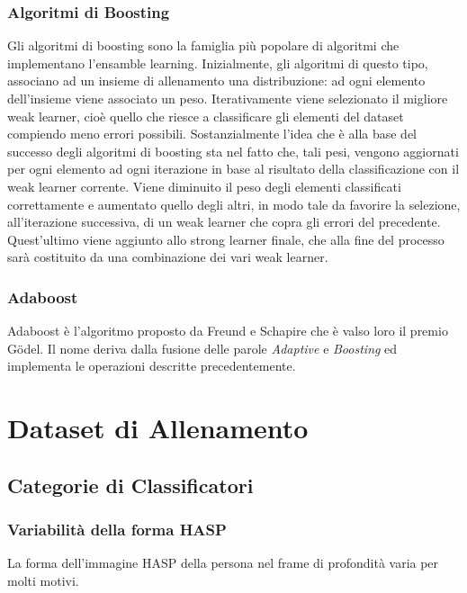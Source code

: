             \subsubsection{Algoritmi di Boosting}
                Gli algoritmi di boosting sono la famiglia più popolare di algoritmi che implementano l'ensamble learning.
                Inizialmente, gli algoritmi di questo tipo, associano ad un insieme di allenamento una distribuzione: ad ogni elemento dell'insieme viene associato un peso.
                Iterativamente viene selezionato il migliore weak learner, cioè quello che riesce a classificare gli elementi del dataset compiendo meno errori possibili.
                Sostanzialmente l'idea che è alla base del successo degli algoritmi di boosting sta nel fatto che, tali pesi, vengono aggiornati per ogni elemento ad ogni iterazione in base al risultato della classificazione con il weak learner corrente. Viene diminuito il peso degli elementi classificati correttamente e aumentato quello degli altri, in modo tale da favorire la selezione, all'iterazione successiva, di un weak learner che copra gli errori del precedente.
                Quest'ultimo viene aggiunto allo strong learner finale, che alla fine del processo sarà costituito da una combinazione dei vari weak learner.

            \subsubsection{Adaboost}
                Adaboost è l'algoritmo proposto da Freund e Schapire che è valso loro il premio Gödel.
                Il nome deriva dalla fusione delle parole \emph{Adaptive} e \emph{Boosting} ed implementa le operazioni descritte precedentemente.

    \section{Dataset di Allenamento}
    \label{sec:training_dataset}
        \subsection{Categorie di Classificatori}
        \label{sub:classifiers_categories}
            \subsubsection{Variabilità della forma HASP}
                La forma dell'immagine HASP della persona nel frame di profondità varia per molti motivi.

